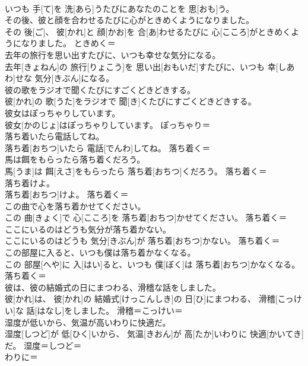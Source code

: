 \documentclass[8pt]{extreport}
\begin{document}
\begin{CJK}{UTF8}{min}
\\	いつも 手[て]を 洗[あら]うたびにあなたのことを 思[おも]う。	
\\	その後、彼と顔を合わせるたびに心がときめくようになりました。	
\\	その 後[ご]、 彼[かれ]と 顔[かお]を 合[あ]わせるたびに 心[こころ]がときめくようになりました。	ときめく＝ 
\\	去年の旅行を思い出すたびに、いつも幸せな気分になる。	
\\	去年[きょねん]の 旅行[りょこう]を 思い出[おもいだ]すたびに、いつも 幸[しあわ]せな 気分[きぶん]になる。	
\\	彼の歌をラジオで聞くたびにすごくどきどきする。	
\\	彼[かれ]の 歌[うた]をラジオで 聞[き]くたびにすごくどきどきする。	
\\	彼女はぽっちゃりしています。	
\\	彼女[かのじょ]はぽっちゃりしています。	ぽっちゃり＝ 
\\	落ち着いたら電話してね。	
\\	落ち着[おちつ]いたら 電話[でんわ]してね。	落ち着く＝ 
\\	馬は餌をもらったら落ち着くだろう。	
\\	馬[うま]は 餌[えさ]をもらったら 落ち着[おちつ]くだろう。	落ち着く＝ 
\\	落ち着けよ。	
\\	落ち着[おちつ]けよ。	落ち着く＝ 
\\	この曲で心を落ち着かせてください。	
\\	この 曲[きょく]で 心[こころ]を 落ち着[おちつ]かせてください。	落ち着く＝ 
\\	ここにいるのはどうも気分が落ち着かない。	
\\	ここにいるのはどうも 気分[きぶん]が 落ち着[おちつ]かない。	落ち着く＝ 
\\	この部屋に入ると、いつも僕は落ち着かなくなる。	
\\	この 部屋[へや]に 入[はい]ると、いつも 僕[ぼく]は 落ち着[おちつ]かなくなる。	落ち着く＝ 
\\	彼は、彼の結婚式の日にまつわる、滑稽な話をしました。	
\\	彼[かれ]は、 彼[かれ]の 結婚式[けっこんしき]の 日[ひ]にまつわる、 滑稽[こっけい]な 話[はなし]をしました。	滑稽＝こっけい＝ 
\\	湿度が低いから、気温が高いわりに快適だ。	
\\	湿度[しつど]が 低[ひく]いから、 気温[きおん]が 高[たか]いわりに 快適[かいてき]だ。	湿度＝しつど＝ 
\\	わりに＝ 

\end{CJK}
\end{document}
